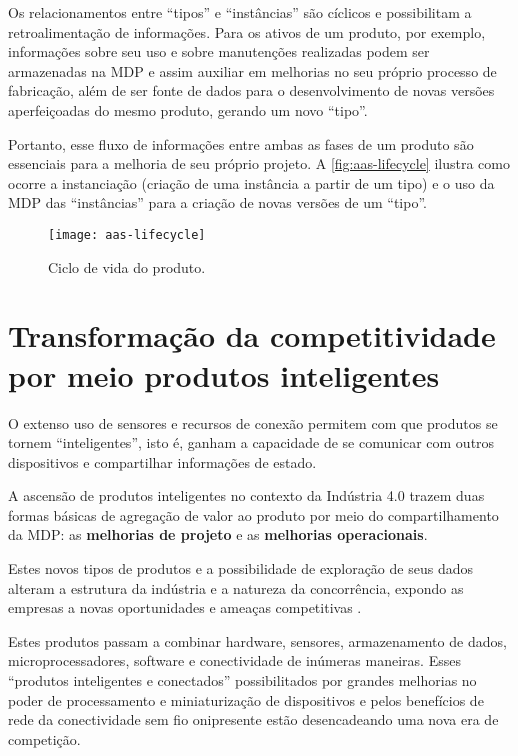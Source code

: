 	Os relacionamentos entre ``tipos'' e ``instâncias'' são cíclicos e possibilitam a retroalimentação de informações. Para os ativos de um produto, por exemplo, informações sobre seu uso e sobre manutenções realizadas podem ser armazenadas na MDP e assim auxiliar em melhorias no seu próprio processo de fabricação, além de ser fonte de dados para o desenvolvimento de novas versões aperfeiçoadas do mesmo produto, gerando um novo ``tipo''.
	
	Portanto, esse fluxo de informações entre ambas as fases de um produto são essenciais para a melhoria de seu próprio projeto. A \autoref{fig:aas-lifecycle} ilustra como ocorre a instanciação (criação de uma instância a partir de um tipo) e o uso da MDP das ``instâncias'' para a criação de novas versões de um ``tipo''.
	
	\begin{figure}[htb!]
		\centering
		\label{fig:aas-lifecycle}
		\texttt{[image: aas-lifecycle]}
		\caption{Ciclo de vida do produto.}
	\end{figure}

\section{Transformação da competitividade por meio produtos inteligentes}

	O extenso uso de sensores e recursos de conexão permitem com que produtos se tornem ``inteligentes'', isto é, ganham a capacidade de se comunicar com outros dispositivos e compartilhar informações de estado.
	
	A ascensão de produtos inteligentes no contexto da Indústria 4.0 trazem duas formas básicas de agregação de valor ao produto por meio do compartilhamento da MDP: as \textbf{melhorias de projeto} e as \textbf{melhorias operacionais}.
	
	Estes novos tipos de produtos e a possibilidade de exploração de seus dados alteram a estrutura da indústria e a natureza da concorrência, expondo as empresas a novas oportunidades e ameaças competitivas \cite{porter2014smartproducts}.
	
	Estes produtos passam a combinar hardware, sensores, armazenamento de dados, microprocessadores, software e conectividade de inúmeras maneiras. Esses “produtos inteligentes e conectados” possibilitados por grandes melhorias no poder de processamento e miniaturização de dispositivos e pelos benefícios de rede da conectividade sem fio onipresente estão desencadeando uma nova era de competição.
	

